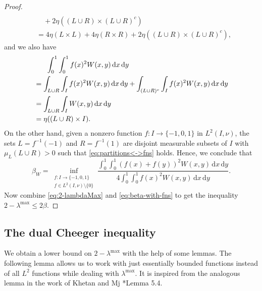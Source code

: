 \documentclass[12pt,a4paper,bold]{thesis}
\theoremstyle{definition}
\newcommand*{\map}[3]{#1 \colon #2 \to #3}
\begin{document}
\begin{proof}
\begin{align*}
        \\
        & \quad +
        2 \eta((L \cup R) \times (L \cup R)^c) 
        \\
        & =
        4 \eta(L \times L) + 4 \eta(R \times R) + 2 \eta((L \cup R) \times (L \cup R)^c),
    \end{align*}
    and we also have
    \begin{align*} 
        & \hspace{0.6cm} 
        \int_0^1 \int_0^1 f(x)^2 W(x,y)\, \mathrm{d}x\, \mathrm{d}y 
        \\
        & =
        \int_{L \cup R} \int_I f(x)^2 W(x,y)\, \mathrm{d}x\, \mathrm{d}y
        + \int_{(L \cup R)^c} \int_I f(x)^2 W(x,y)\, \mathrm{d}x\, \mathrm{d}y
        \\
        & =
        \int_{L \cup R} \int_I W(x,y)\, \mathrm{d}x\, \mathrm{d}y 
        \\
        & =
        \eta((L \cup R) \times I).
    \end{align*}
    On the other hand, given a nonzero function $\map{f}{I}{\{-1,0,1\}}$ in $L^2(I, \nu)$,
    the sets $L = f^{-1}(-1)$ and $R = f^{-1}(1)$ are disjoint measurable subsets
    of $I$ with $\mu_L(L \cup R) > 0$ such that \cref{eq:partitions<->fns} holds. 
    Hence, we conclude that
    \begin{equation} \label{eq:beta-with-fns}
        \beta_W = \inf_{\substack{\map{f}{I}{\{-1,0,1\}} \\ f \in L^2(I, \nu) \setminus \{0\}}}
        \frac{\int_{0}^{1} \int_{0}^{1} (f(x) + f(y))^2 W(x,y)\, \mathrm{d}x\, \mathrm{d}y}
        {4 \int_0^1 \int_0^1 f(x)^2 W(x,y)\, \mathrm{d}x\, \mathrm{d}y}.
    \end{equation}
    Now combine \cref{eq:2-lambdaMax} and \cref{eq:beta-with-fns} to get the inequality 
    $2 - \lambda^{\max} \leq 2 \beta$.
\end{proof}

\subsection{The dual Cheeger inequality}

We obtain a lower bound on $2 - \lambda^{\max}$ with the help of some lemmas. 
The following lemma allows us to work with just essentially bounded functions
instead of all $L^2$ functions while dealing with $\lambda^{\max}$.
It is inspired from the analogous lemma in the work of Khetan and Mj 
\cite{Abhishek-Mahan24}*{Lemma 5.4}.
\end{document}
